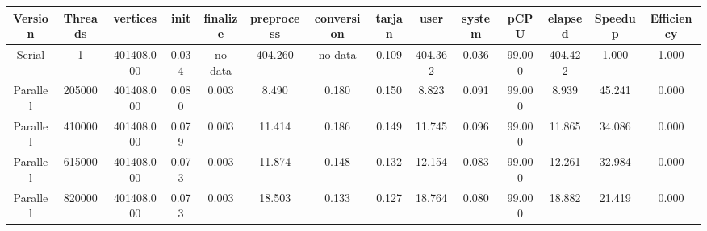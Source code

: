 \begin{tabular}{|c|c|c|c|c|c|c|c|c|c|c|c|c|c|}
\toprule
 Version &  Threads &   vertices &  init & finalize &  preprocess & conversion &  tarjan &    user &  system &   pCPU &  elapsed &  Speedup &  Efficiency \\
\midrule
  Serial &        1 & 401408.000 & 0.034 &  no data &     404.260 &    no data &   0.109 & 404.362 &   0.036 & 99.000 &  404.422 &    1.000 &       1.000 \\
Parallel &   205000 & 401408.000 & 0.080 &    0.003 &       8.490 &      0.180 &   0.150 &   8.823 &   0.091 & 99.000 &    8.939 &   45.241 &       0.000 \\
Parallel &   410000 & 401408.000 & 0.079 &    0.003 &      11.414 &      0.186 &   0.149 &  11.745 &   0.096 & 99.000 &   11.865 &   34.086 &       0.000 \\
Parallel &   615000 & 401408.000 & 0.073 &    0.003 &      11.874 &      0.148 &   0.132 &  12.154 &   0.083 & 99.000 &   12.261 &   32.984 &       0.000 \\
Parallel &   820000 & 401408.000 & 0.073 &    0.003 &      18.503 &      0.133 &   0.127 &  18.764 &   0.080 & 99.000 &   18.882 &   21.419 &       0.000 \\
\bottomrule
\end{tabular}
